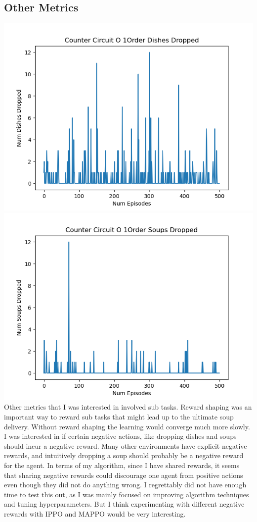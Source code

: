\documentclass[conference]{IEEEtran}
\begin{document}
\subsection{Other Metrics}
\includegraphics[scale=0.5]{counter_circuit_dishes.png}
\includegraphics[scale=0.5]{counter_circuit_soups.png}
Other metrics that I was interested in involved sub tasks. Reward shaping was an important way to reward sub tasks that might lead up to the 
ultimate soup delivery. Without reward shaping the learning would converge much more slowly.
I was interested in if certain negative actions, like dropping dishes and soups should incur a negative reward. Many other environments 
have explicit negative rewards, and intuitively dropping a soup should probably be a negative reward for the agent. In terms of my algorithm, since
I have shared rewards, it seems that sharing negative rewards could discourage one agent from positive actions even though they did not do anything 
wrong. I regrettably did not have enough time to test this out, as I was mainly focused on improving algorithm techniques and tuning hyperparameters.
But I think experimenting with different negative rewards with IPPO and MAPPO would be very interesting. 
\end{document}

